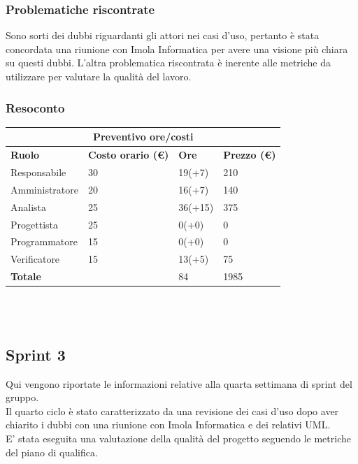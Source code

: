 \documentclass[10pt]{article}
\begin{document}
\subsubsection{Problematiche riscontrate}
Sono sorti dei dubbi riguardanti gli attori nei casi d'uso, pertanto è stata concordata una riunione con Imola Informatica per avere una visione più chiara su questi dubbi.
L'altra problematica riscontrata è inerente alle metriche da utilizzare per valutare la qualità del lavoro.
\subsubsection{Resoconto}
\begin{center}
	\begin{tabularx}{\textwidth}{|X|X|X|X|}
		\hline
		\multicolumn{4}{|c|}{\textbf{Preventivo ore/costi}}                                      \\
		\hline
		\hline
		\textbf{Ruolo}  & \textbf{Costo orario (\euro)} & \textbf{Ore} & \textbf{Prezzo (\euro)} \\
		\hline
		Responsabile    & 30                            & 19(+7)       & 210                     \\
		\hline
		Amministratore  & 20                            & 16(+7)       & 140                     \\
		\hline
		Analista        & 25                            & 36(+15)      & 375                     \\
		\hline
		Progettista     & 25                            & 0(+0)        & 0                       \\
		\hline
		Programmatore   & 15                            & 0(+0)        & 0                       \\
		\hline
		Verificatore    & 15                            & 13(+5)       & 75                      \\
		\hline
		\hline
		\textbf{Totale} &                               & 84           & 1985                    \\
		\hline
	\end{tabularx}\\[8pt]
	\mbox{}\\
\end{center}


\subsection{Sprint 3}
Qui vengono riportate le informazioni relative alla quarta settimana di sprint del gruppo. \\
Il quarto ciclo è stato caratterizzato da una revisione dei casi d'uso dopo aver chiarito i dubbi con una riunione con Imola Informatica e dei relativi UML.\\
E' stata eseguita una valutazione della qualità del progetto seguendo le metriche del piano di qualifica.
\end{document}
